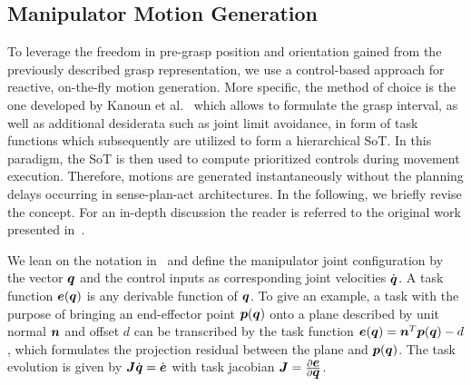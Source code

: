 \subsection{Manipulator Motion Generation}
\label{subsec:manip_motion}
%
To leverage the freedom in pre-grasp position and orientation gained from the previously described
grasp representation, we use a control-based approach for reactive, on-the-fly motion
generation. More specific, the method of choice is the one developed by Kanoun et al.~\cite{Kano11}
which allows to formulate the grasp interval, as well as additional desiderata such as joint limit
avoidance, in form of task functions which subsequently are utilized to form a hierarchical SoT. In
this paradigm, the SoT is then used to compute prioritized controls during movement
execution. Therefore, motions are generated instantaneously without the planning delays occurring in
sense-plan-act architectures. In the following, we briefly revise the concept. For an in-depth
discussion the reader is referred to the original work presented in~\cite{Kano11}.

We lean on the notation in~\cite{Esca14} and define the manipulator joint configuration by the
vector $\mbox{\boldmath $q$}$ and the control inputs as corresponding joint velocities $\dot{\mbox{\boldmath $q$}}$. A task
function $\mbox{\boldmath $e$}(\mbox{\boldmath $q$})$ is any derivable function of $\mbox{\boldmath $q$}$. To give an example, a task with
the purpose of bringing an end-effector point $\mbox{\boldmath $p$}(\mbox{\boldmath $q$})$ onto a plane described by unit
normal $\mbox{\boldmath $n$}$ and offset $d$ can be transcribed by the task function
$\mbox{\boldmath $e$}(\mbox{\boldmath $q$})=\mbox{\boldmath $n$}^T\mbox{\boldmath $p$}(\mbox{\boldmath $q$})-d$, which formulates the projection residual between the
plane and $\mbox{\boldmath $p$}(\mbox{\boldmath $q$})$. The task evolution is given by $\mbox{\boldmath $J$}\dot{\mbox{\boldmath $q$}}=\dot{\mbox{\boldmath $e$}}$
with task jacobian $\mbox{\boldmath $J$}=\frac{\partial\mbox{\boldmath $e$}}{\partial\mbox{\boldmath $q$}}$.

